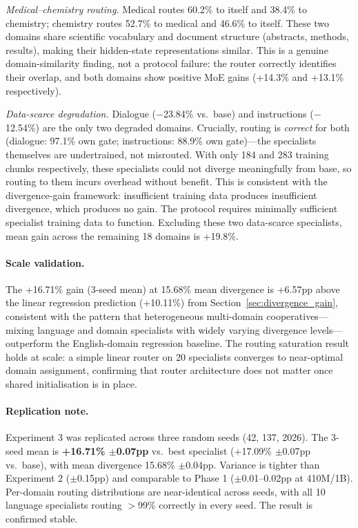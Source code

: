 \documentclass{article}
\begin{document}
\emph{Medical--chemistry routing.} Medical routes 60.2\% to itself and 38.4\% to chemistry; chemistry routes 52.7\% to medical and 46.6\% to itself. These two domains share scientific vocabulary and document structure (abstracts, methods, results), making their hidden-state representations similar. This is a genuine domain-similarity finding, not a protocol failure: the router correctly identifies their overlap, and both domains show positive MoE gains (+14.3\% and +13.1\% respectively).

\emph{Data-scarce degradation.} Dialogue ($-$23.84\% vs.\ base) and instructions ($-$12.54\%) are the only two degraded domains. Crucially, routing is \emph{correct} for both (dialogue: 97.1\% own gate; instructions: 88.9\% own gate)---the specialists themselves are undertrained, not misrouted. With only 184 and 283 training chunks respectively, these specialists could not diverge meaningfully from base, so routing to them incurs overhead without benefit. This is consistent with the divergence-gain framework: insufficient training data produces insufficient divergence, which produces no gain. The protocol requires minimally sufficient specialist training data to function. Excluding these two data-scarce specialists, mean gain across the remaining 18 domains is +19.8\%.

\paragraph{Scale validation.} The +16.71\% gain (3-seed mean) at 15.68\% mean divergence is +6.57pp above the linear regression prediction (+10.11\%) from Section~\ref{sec:divergence_gain}, consistent with the pattern that heterogeneous multi-domain cooperatives---mixing language and domain specialists with widely varying divergence levels---outperform the English-domain regression baseline. The routing saturation result holds at scale: a simple linear router on 20 specialists converges to near-optimal domain assignment, confirming that router architecture does not matter once shared initialisation is in place.

\paragraph{Replication note.} Experiment 3 was replicated across three random seeds (42, 137, 2026). The 3-seed mean is \textbf{+16.71\% $\pm$0.07pp} vs.\ best specialist (+17.09\% $\pm$0.07pp vs.\ base), with mean divergence 15.68\% $\pm$0.04pp. Variance is tighter than Experiment 2 ($\pm$0.15pp) and comparable to Phase 1 ($\pm$0.01--0.02pp at 410M/1B). Per-domain routing distributions are near-identical across seeds, with all 10 language specialists routing $>$99\% correctly in every seed. The result is confirmed stable.
\end{document}
